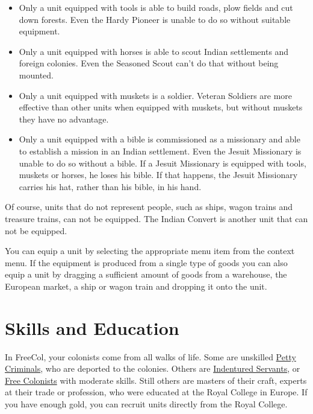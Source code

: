 \documentclass[12pt]{book}
\begin{document}
\begin{itemize}
\item Only a unit equipped with tools is able to build roads, plow
  fields and cut down forests. Even the Hardy Pioneer is unable to do
  so without suitable equipment.

\item Only a unit equipped with horses is able to scout Indian
  settlements and foreign colonies. Even the Seasoned Scout can't do
  that without being mounted.

\item Only a unit equipped with muskets is a soldier. Veteran Soldiers
  are more effective than other units when equipped with muskets, but
  without muskets they have no advantage.

\item Only a unit equipped with a bible is commissioned as a
  missionary and able to establish a mission in an Indian
  settlement. Even the Jesuit Missionary is unable to do so without a
  bible. If a Jesuit Missionary is equipped with tools, muskets or
  horses, he loses his bible. If that happens, the Jesuit Missionary
  carries his hat, rather than his bible, in his hand.
\end{itemize}

Of course, units that do not represent people, such as ships, wagon
trains and treasure trains, can not be equipped. The Indian Convert is
another unit that can not be equipped.

You can equip a unit by selecting the appropriate menu item from the
context menu. If the equipment is produced from a single type of goods
you can also equip a unit by dragging a sufficient amount of goods
from a warehouse, the European market, a ship or wagon train and
dropping it onto the unit.


\hypertarget{Skills and Education}{\section{Skills and Education}}

In FreeCol, your colonists come from all walks of life. Some are
unskilled \hyperlink{Petty Criminal}{Petty Criminals}, who are
deported to the colonies. Others are \hyperlink{Indentured
Servant}{Indentured Servants}, or \hyperlink{Free Colonist}{Free
Colonists} with moderate skills. Still others are masters of their
craft, experts at their trade or profession, who were educated at the
Royal College in Europe. If you have enough gold, you can recruit
units directly from the Royal College.
\end{document}
